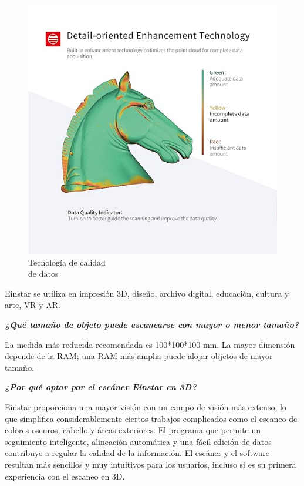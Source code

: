 \documentclass[compacto,5pt,comentarios]{aleph-notas}
\begin{document}
\begin{figure}[H]
\begin{minipage}[t]{0.48\linewidth}
        \includegraphics[width=\linewidth]{Logos/Einstar_Details.jpg}
        \caption{Tecnología de calidad \\ de datos}
        \label{fig:imagen2}
    \end{minipage}
    \label{fig:dos-imagenes}
\end{figure}

Einstar se utiliza en impresión 3D, diseño, archivo digital, educación, cultura y arte, VR y AR.

\textit{\textbf{¿Qué tamaño de objeto puede escanearse con mayor o menor tamaño?}}

La medida más reducida recomendada es 100*100*100 mm. La mayor dimensión depende de la RAM; una RAM más amplia puede alojar objetos de mayor tamaño.

\textbf{\textit{¿Por qué optar por el escáner Einstar en 3D?}}

Einstar proporciona una mayor visión con un campo de visión más extenso, lo que simplifica considerablemente ciertos trabajos complicados como el escaneo de colores oscuros, cabello y áreas exteriores. El programa que permite un seguimiento inteligente, alineación automática y una fácil edición de datos contribuye a regular la calidad de la información. El escáner y el software resultan más sencillos y muy intuitivos para los usuarios, incluso si es su primera experiencia con el escaneo en 3D.
\end{document}
